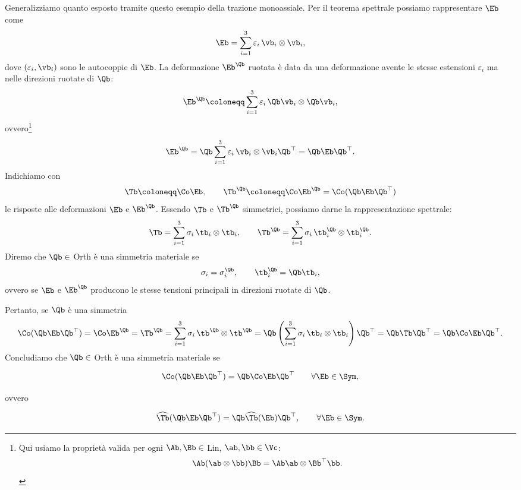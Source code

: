 Generalizziamo quanto esposto tramite questo esempio della trazione monoassiale. Per il teorema spettrale possiamo rappresentare $\Eb$ come
\begin{equation}\label{espettr1}
	\Eb=\sum_{i=1}^{3}\varepsilon_i\, \vb_i\otimes \vb_i,
\end{equation}
dove $(\varepsilon_i, \vb_i)$ sono le autocoppie di $\Eb$. La deformazione $\Eb^\Qb$ ruotata è data da una deformazione avente le stesse estensioni $\varepsilon_i$ ma nelle direzioni ruotate di $\Qb$:
\begin{equation}
\Eb^\Qb\coloneqq \sum_{i=1}^{3}\varepsilon_i\, \Qb\vb_i\otimes \Qb\vb_i,
\end{equation}
ovvero\footnote{Qui usiamo la proprietà valida per ogni $\Ab, \Bb\in$ Lin, $\ab, \bb \in \Vc$:
	\begin{equation}
		\Ab(\ab\otimes\bb)\Bb=\Ab \ab \otimes \Bb^\top \bb.
\end{equation}}
\begin{equation}
\Eb^\Qb=\Qb\sum_{i=1}^{3}\varepsilon_i\, \vb_i\otimes \vb_i \Qb ^\top = \Qb \Eb \Qb^\top.
\end{equation}
Indichiamo con 
\begin{equation}
	\Tb \coloneqq\Co \Eb, \qquad \Tb^\Qb\coloneqq \Co \Eb^\Qb=\Co (\Qb \Eb \Qb^\top)
\end{equation}
le risposte alle deformazioni $\Eb$ e $\Eb^\Qb$. Essendo $\Tb$ e $\Tb^\Qb$ simmetrici, possiamo darne la rappresentazione spettrale:
\begin{equation}
	\Tb=\sum_{i=1}^{3}\sigma_i\, \tb_i\otimes \tb_i, \qquad 	\Tb^\Qb=\sum_{i=1}^{3}\sigma_i\, \tb^\Qb_i\otimes \tb^\Qb_i.
\end{equation}
Diremo che $\Qb\in$ Orth è una simmetria materiale se
\begin{equation}
\sigma_i=\sigma_i^\Qb, \qquad \tb_i^\Qb=\Qb \tb_i,
\end{equation}
ovvero se $\Eb$ e $\Eb^\Qb$ producono le stesse tensioni principali in direzioni ruotate di $\Qb$. 

Pertanto, se $\Qb$ è una simmetria
\begin{equation}
\Co(\Qb\Eb \Qb^\top)=\Co \Eb^\Qb=\Tb^\Qb=\sum_{i=1}^{3}\sigma_i\, \tb^\Qb\otimes \tb^\Qb=\Qb \left(  \sum_{i=1}^{3}\sigma_i\, \tb_i\otimes \tb_i \right)\Qb^\top=\Qb \Tb \Qb^\top=\Qb\Co \Eb \Qb^\top.
\end{equation}
Concludiamo che $\Qb\in$ Orth è una simmetria materiale se
\begin{definition}
\begin{equation}
		\Co(\Qb\Eb \Qb^\top)=\Qb \Co \Eb \Qb ^\top \qquad \forall \Eb \in \Sym,
\end{equation}
\end{definition}
ovvero 
\begin{definition}
	\begin{equation}
		\widehat{\Tb}(\Qb \Eb \Qb ^\top)=\Qb \widehat{\Tb}(\Eb)\Qb ^\top, \qquad \forall \Eb \in \Sym.
	\end{equation}
\end{definition}

